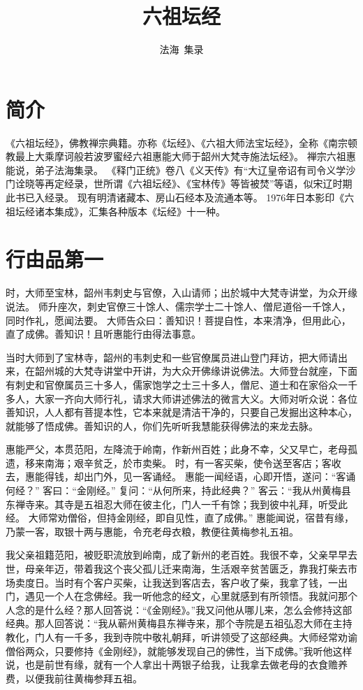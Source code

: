 \documentclass[12pt,twoside,openany]{book}
\title{六祖坛经}
\author{法海\ 集录}
\date{}
\newcommand{\kai}[1]{{\CJKfamily{kai}#1}}
\begin{document}

\maketitle
\tableofcontents

\noindent
\chapter*{简介}
《六祖坛经》，佛教禅宗典籍。亦称《坛经》、《六祖大师法宝坛经》，全称《南宗顿教最上大乘摩诃般若波罗蜜经六祖惠能大师于韶州大梵寺施法坛经》。
禅宗六祖惠能说，弟子法海集录。
《释门正统》卷八《义天传》有“大辽皇帝诏有司令义学沙门诠晓等再定经录，世所谓《六祖坛经》、《宝林传》等皆被焚”等语，似宋辽时期此书已入经录。
现有明清诸藏本、房山石经本及流通本等。
1976年日本影印《六祖坛经诸本集成》，汇集各种版本《坛经》十一种。

\chapter{行由品第一}
时，大师至宝林，韶州韦刺史与官僚，入山请师；出於城中大梵寺讲堂，为众开缘说法。
师升座次，刺史官僚三十馀人、儒宗学士二十馀人、僧尼道俗一千馀人，同时作礼，愿闻法要。
大师告众曰：善知识！菩提自性，本来清净，但用此心，直了成佛。善知识！且听惠能行由得法事意。

\kai{当时大师到了宝林寺，韶州的韦刺史和一些官僚属员进山登门拜访，把大师请出来，在韶州城的大梵寺讲堂中开讲，为大众开佛缘讲说佛法。大师登台就座，下面有刺史和官僚属员三十多人，儒家饱学之士三十多人，僧尼、道士和在家俗众一千多人，大家一齐向大师行礼，请求大师讲述佛法的微言大义。大师对听众说：各位善知识，人人都有菩提本性，它本来就是清洁干净的，只要自己发掘出这种本心，就能够了悟成佛。善知识的人，你们先听听我慧能获得佛法的来龙去脉。}

惠能严父，本贯范阳，左降流于岭南，作新州百姓；此身不幸，父又早亡，老母孤遗，移来南海；艰辛贫乏，於市卖柴。
时，有一客买柴，使令送至客店；客收去，惠能得钱，却出门外，见一客诵经。
惠能一闻经语，心即开悟，遂问：“客诵何经？”
客曰：“金刚经。”
复问：“从何所来，持此经典？”
客云：“我从州黄梅县东禅寺来。其寺是五祖忍大师在彼主化，门人一千有馀；我到彼中礼拜，听受此经。
大师常劝僧俗，但持金刚经，即自见性，直了成佛。”
惠能闻说，宿昔有缘，乃蒙一客，取银十两与惠能，令充老母衣粮，教便往黄梅参礼五祖。

\kai{我父亲祖籍范阳，被贬职流放到岭南，成了新州的老百姓。我很不幸，父亲早早去世，母亲年迈，带着我这个丧父孤儿迁来南海，生活艰辛贫苦匮乏，靠我打柴去市场卖度日。当时有个客户买柴，让我送到客店去，客户收了柴，我拿了钱，一出门，遇见一个人在念佛经。我一听他念的经文，心里就感到有所领悟。我就问那个人念的是什么经？那人回答说：“《金刚经》。”我又问他从哪儿来，怎么会修持这部经典。那人回答说：“我从蕲州黄梅县东禅寺来，那个寺院是五祖弘忍大师在主持教化，门人有一千多，我到寺院中敬礼朝拜，听讲领受了这部经典。大师经常劝谕僧俗两众，只要修持《金刚经》，就能够发现自己的佛性，当下成佛。”我听他这样说，也是前世有缘，就有一个人拿出十两银子给我，让我拿去做老母的衣食赡养费，以便我前往黄梅参拜五祖。}
\end{document}
